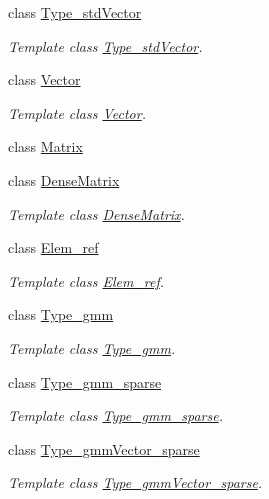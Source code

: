 \begin{DoxyCompactItemize}
class \hyperlink{classlmx_1_1Type__stdVector}{Type\-\_\-std\-Vector}
\begin{DoxyCompactList}\small\item\em Template class \hyperlink{classlmx_1_1Type__stdVector}{Type\-\_\-std\-Vector}. \end{DoxyCompactList}\item 
class \hyperlink{classlmx_1_1Vector}{Vector}
\begin{DoxyCompactList}\small\item\em Template class \hyperlink{classlmx_1_1Vector}{Vector}. \end{DoxyCompactList}\item 
class \hyperlink{classlmx_1_1Matrix}{Matrix}
\item 
class \hyperlink{classlmx_1_1DenseMatrix}{Dense\-Matrix}
\begin{DoxyCompactList}\small\item\em Template class \hyperlink{classlmx_1_1DenseMatrix}{Dense\-Matrix}. \end{DoxyCompactList}\item 
class \hyperlink{classlmx_1_1Elem__ref}{Elem\-\_\-ref}
\begin{DoxyCompactList}\small\item\em Template class \hyperlink{classlmx_1_1Elem__ref}{Elem\-\_\-ref}. \end{DoxyCompactList}\item 
class \hyperlink{classlmx_1_1Type__gmm}{Type\-\_\-gmm}
\begin{DoxyCompactList}\small\item\em Template class \hyperlink{classlmx_1_1Type__gmm}{Type\-\_\-gmm}. \end{DoxyCompactList}\item 
class \hyperlink{classlmx_1_1Type__gmm__sparse}{Type\-\_\-gmm\-\_\-sparse}
\begin{DoxyCompactList}\small\item\em Template class \hyperlink{classlmx_1_1Type__gmm__sparse}{Type\-\_\-gmm\-\_\-sparse}. \end{DoxyCompactList}\item 
class \hyperlink{classlmx_1_1Type__gmmVector__sparse}{Type\-\_\-gmm\-Vector\-\_\-sparse}
\begin{DoxyCompactList}\small\item\em Template class \hyperlink{classlmx_1_1Type__gmmVector__sparse}{Type\-\_\-gmm\-Vector\-\_\-sparse}. \end{DoxyCompactList}\item 

\end{DoxyCompactItemize}
